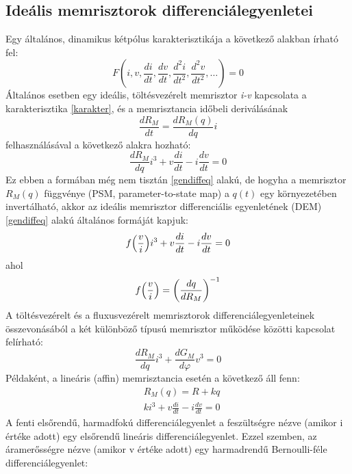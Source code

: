 \documentclass[twoside]{article}
\newcommand\fun[2]{%
	f\mleft(\frac{#1}{#2}\mright)%
}
\begin{document}
 \subsection{Ideális memrisztorok differenciálegyenletei}
 Egy általános, dinamikus kétpólus karakterisztikája a következő alakban írható fel:
 \begin{equation}\label{gendiffeq}
 	F(i,v, \frac{di}{dt}, \frac{dv}{dt}, \frac{d^2i}{dt^2}, \frac{d^2v}{dt^2}, \dots) = 0
 \end{equation}
 Általános esetben egy ideális, töltésvezérelt memrisztor \emph{i-v} kapcsolata a karakterisztika \eqref{karakter}, és a memrisztancia időbeli deriválásának
 \begin{equation}
 	\frac{dR_M}{dt} = \frac{dR_M(q)}{dq}i
 \end{equation}
 felhasználásával a következő alakra hozható: \cite{biolek2015}
 \begin{equation}\label{diffeq1}
	\frac{dR_M}{dq}i^3 + v\frac{di}{dt} - i\frac{dv}{dt} = 0
 \end{equation}
 Ez ebben a formában még nem tisztán \eqref{gendiffeq} alakú, de hogyha a memrisztor $R_M(q)$ függvénye (PSM, parameter-to-state map) a $q(t)$ egy környezetében invertálható, akkor az ideális memrisztor differenciális egyenletének (DEM) \eqref{gendiffeq} alakú általános formáját kapjuk:
 \begin{equation} \label{diffeq2}
\fun{v}{i}i^3 + v\frac{di}{dt} - i\frac{dv}{dt} = 0
 \end{equation}
 ahol \begin{equation}
 	\fun{v}{i} = \mleft(\frac{dq}{dR_M}\mright)^{-1}
 \end{equation}
 A töltésvezérelt és a fluxusvezérelt memrisztorok differenciálegyenleteinek összevonásából a két különböző típusú memrisztor működése közötti kapcsolat felírható:
 \begin{equation}
 	\frac{dR_M}{dq}i^3 + \frac{dG_M}{d\varphi}v^3 = 0
 \end{equation}
 Példaként, a lineáris (affin) memrisztancia esetén a következő áll fenn:
 \begin{align}
 	&R_M(q) = R + kq \\
 	&ki^3 + v\frac{di}{dt} - i\frac{dv}{dt} = 0
 \end{align}
 A fenti elsőrendű, harmadfokú differenciálegyenlet a feszültségre nézve (amikor i értéke adott) egy elsőrendű lineáris differenciálegyenlet. Ezzel szemben, az áramerősségre nézve (amikor v értéke adott) egy harmadrendű Bernoulli-féle differenciálegyenlet: \cite{biolek2015}
\end{document}

